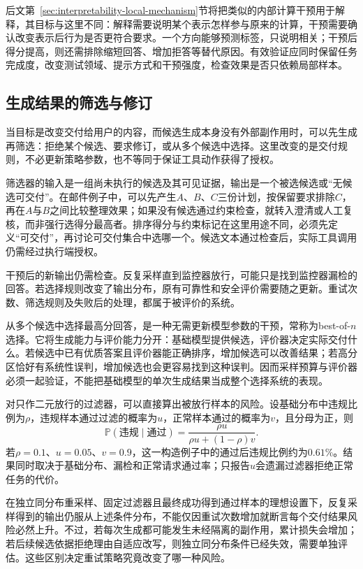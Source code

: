后文第~\ref{sec:interpretability-local-mechanism}节将把类似的内部计算干预用于解释，其目标与这里不同：解释需要说明某个表示怎样参与原来的计算，干预需要确认改变表示后行为是否更符合要求。一个方向能够预测标签，只说明相关；干预后得分提高，则还需排除缩短回答、增加拒答等替代原因。有效验证应同时保留任务完成度，改变测试领域、提示方式和干预强度，检查效果是否只依赖局部样本。

\subsection{生成结果的筛选与修订}
\label{sec:alignment-intervention-selection}

当目标是改变交付给用户的内容，而候选生成本身没有外部副作用时，可以先生成再筛选：拒绝某个候选、要求修订，或从多个候选中选择。这里改变的是交付规则，不必更新策略参数，也不等同于保证工具动作获得了授权。

筛选器的输入是一组尚未执行的候选及其可见证据，输出是一个被选候选或“无候选可交付”。在邮件例子中，可以先产生$A$、$B$、$C$三份计划，按保留要求排除$C$，再在$A$与$B$之间比较整理效果；如果没有候选通过约束检查，就转入澄清或人工复核，而非强行选得分最高者。排序得分与约束标记在这里用途不同，必须先定义“可交付”，再讨论可交付集合中选哪一个。候选文本通过检查后，实际工具调用仍需经过执行端授权。

干预后的新输出仍需检查。反复采样直到监控器放行，可能只是找到监控器漏检的回答。若选择规则改变了输出分布，原有可靠性和安全评价需要随之更新。重试次数、筛选规则及失败后的处理，都属于被评价的系统。

从多个候选中选择最高分回答，是一种无需更新模型参数的干预，常称为best-of-$n$选择。它将生成能力与评价能力分开：基础模型提供候选，评价器决定实际交付什么。若候选中已有优质答案且评价器能正确排序，增加候选可以改善结果；若高分区恰好有系统性误判，增加候选也会更容易找到这种误判。因而采样预算与评价器必须一起验证，不能把基础模型的单次生成结果当成整个选择系统的表现。

对只作二元放行的过滤器，可以直接算出被放行样本的风险。设基础分布中违规比例为$\rho$，违规样本通过过滤的概率为$u$，正常样本通过的概率为$v$，且分母为正，则
\begin{equation}
 \mathbb P(\text{违规}\mid\text{通过})
 =\frac{\rho u}{\rho u+(1-\rho)v}.
 \label{eq:alignment-filter-risk}
\end{equation}
若$\rho=0.1$、$u=0.05$、$v=0.9$，这一构造例子中的通过后违规比例约为$0.61\%$。结果同时取决于基础分布、漏检和正常请求通过率；只报告$u$会遗漏过滤器拒绝正常任务的代价。

在独立同分布重采样、固定过滤器且最终成功得到通过样本的理想设置下，反复采样得到的输出仍服从上述条件分布，不能仅因重试次数增加就断言每个交付结果风险必然上升。不过，若每次生成都可能发生未经隔离的副作用，累计损失会增加；若后续候选依据拒绝理由自适应改写，则独立同分布条件已经失效，需要单独评估。这些区别决定重试策略究竟改变了哪一种风险。

